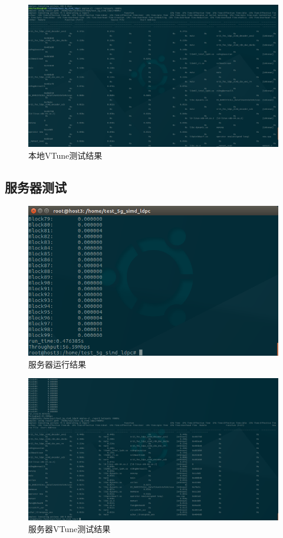 \documentclass{article}
\begin{document}
\begin{figure}[H]
	\centering
	\includegraphics[width = \textwidth]{vtunel.png}
	\caption{本地VTune测试结果}
\end{figure}

\subsection{服务器测试}
\begin{figure}[H]
	\centering
	\includegraphics[width = .8\textwidth]{res.png}
	\caption{服务器运行结果}
\end{figure}
\begin{figure}[H]
	\centering
	\includegraphics[width = \textwidth]{vtune.png}
	\caption{服务器VTune测试结果}
\end{figure}
\end{document}

